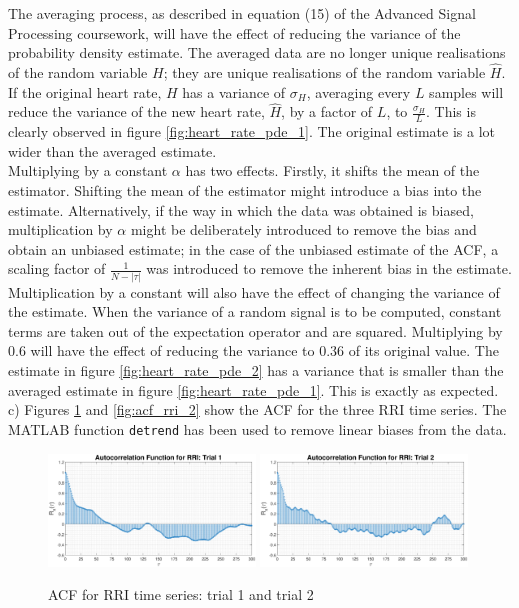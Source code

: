 \documentclass{article}
\begin{document}
The averaging process, as described in equation (15) of the Advanced Signal Processing coursework, will have the effect of reducing the variance of the probability density estimate. The averaged data are no longer unique realisations of the random variable $H$; they are unique realisations of the random variable $\hat{H}$. If the original heart rate, $H$ has a variance of $\sigma_{H}$, averaging every $L$ samples will reduce the variance of the new heart rate, $\hat{H}$, by a factor of $L$, to $\frac{\sigma_{H}}{L}$. This is clearly observed in figure \ref{fig:heart_rate_pde_1}. The original estimate is a lot wider than the averaged estimate.\\

Multiplying by a constant $\alpha$ has two effects. Firstly, it shifts the mean of the estimator. Shifting the mean of the estimator might introduce a bias into the estimate. Alternatively, if the way in which the data was obtained is biased, multiplication by $\alpha$ might be deliberately introduced to remove the bias and obtain an unbiased estimate; in the case of the unbiased estimate of the ACF, a scaling factor of $\frac{1}{N-|\tau|}$ was introduced to remove the inherent bias in the estimate.\\ 

Multiplication by a constant will also have the effect of changing the variance of the estimate. When the variance of a random signal is to be computed, constant terms are taken out of the expectation operator and are squared. Multiplying by $0.6$ will have the effect of reducing the variance to $0.36$ of its original value. The estimate in figure \ref{fig:heart_rate_pde_2} has a variance that is smaller than the averaged estimate in figure \ref{fig:heart_rate_pde_1}. This is exactly as expected.\\

c) Figures \ref{fig:acf_rri_1} and \ref{fig:acf_rri_2} show the ACF for the three RRI time series. The MATLAB function {\tt detrend} has been used to remove linear biases from the data.

\begin{figure}[H]
    \centering
    \includegraphics[width = 0.49\textwidth]{acf_rri_1}
    \includegraphics[width = 0.49\textwidth]{acf_rri_2}
    \caption{ACF for RRI time series: trial 1 and trial 2}
    \label{fig:acf_rri_1}
\end{figure}
\end{document}
